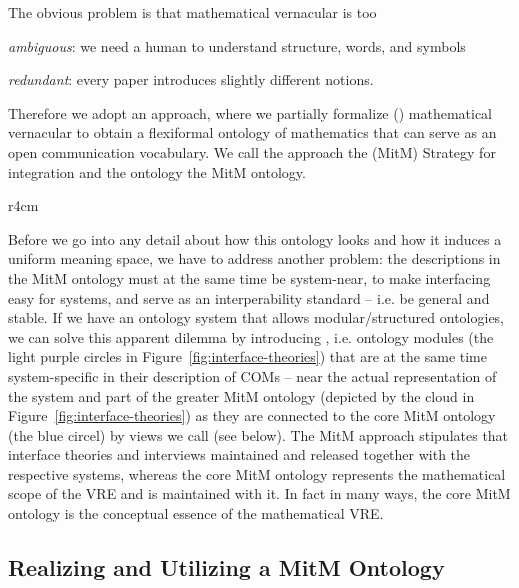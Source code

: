 The obvious problem is that mathematical vernacular is too 
\begin{inparaenum}[\em i\rm)]
\item \emph{ambiguous}: we need a human to understand structure, words, and symbols
\item \emph{redundant}: every paper introduces slightly different notions. 
\end{inparaenum}
Therefore we adopt an approach, where we partially formalize ()
mathematical vernacular to obtain a flexiformal ontology of mathematics that can serve as
an open communication vocabulary. We call the approach the 
(MitM) Strategy for integration and the ontology the MitM ontology. 
\begin{wrapfigure}r{4cm}\vspace*{-1.5em}
  \vspace*{-.5em}
  \caption{Interface theories}\label{fig:interface-theories}\vspace*{-1em}
\end{wrapfigure}
Before we go into any detail about how this ontology looks and how it induces a uniform
meaning space, we have to address another problem: the descriptions in the MitM ontology
must at the same time be system-near, to make interfacing easy for systems, and serve as
an interperability standard -- i.e. be general and stable. If we have an ontology system
that allows modular/structured ontologies, we can solve this apparent dilemma by
introducing , i.e. ontology modules (the light purple circles
in Figure~\ref{fig:interface-theories}) that are at the same time system-specific in their
description of COMs -- near the actual representation of the system and part of the
greater MitM ontology (depicted by the cloud in Figure~\ref{fig:interface-theories}) as
they are connected to the core MitM ontology (the blue circel) by views we call
 (see below). The MitM approach stipulates that interface theories and
interviews maintained and released together with the respective systems, whereas the core
MitM ontology represents the mathematical scope of the VRE and is maintained with it. In
fact in many ways, the core MitM ontology is the conceptual essence of the mathematical
VRE.

\subsection{Realizing and Utilizing a MitM Ontology}

